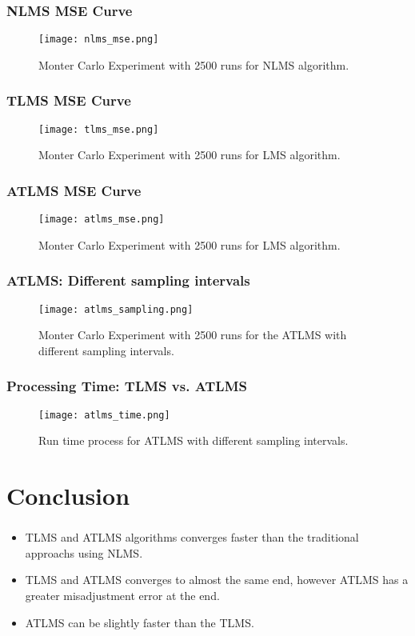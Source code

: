 \documentclass[10pt]{beamer}
\begin{document}
\begin{frame}
    \frametitle{NLMS MSE Curve}
    \begin{figure}
        \centering
        \texttt{[image: nlms\_mse.png]}
        \caption{Monter Carlo Experiment with 2500 runs for NLMS algorithm.}
        \label{fig:nlms} 
    \end{figure}
\end{frame}

\begin{frame}
    \frametitle{TLMS MSE Curve}
    \begin{figure}
        \centering
        \texttt{[image: tlms\_mse.png]}
        \caption{Monter Carlo Experiment with 2500 runs for LMS algorithm.}
        \label{fig:tlms} 
    \end{figure}
\end{frame}

\begin{frame}
    \frametitle{ATLMS MSE Curve}
    \begin{figure}
        \centering
        \texttt{[image: atlms\_mse.png]}
        \caption{Monter Carlo Experiment with 2500 runs for LMS algorithm.}
        \label{fig:atlms} 
    \end{figure}
\end{frame}

\begin{frame}
    \frametitle{ATLMS: Different sampling intervals}
    \begin{figure}
        \centering
        \texttt{[image: atlms\_sampling.png]}
        \caption{Monter Carlo Experiment with 2500 runs for the ATLMS with different sampling intervals.}
        \label{fig:atlms_sampling} 
    \end{figure}
\end{frame}

\begin{frame}
    \frametitle{Processing Time: TLMS vs. ATLMS}
    \begin{figure}
        \centering
        \texttt{[image: atlms\_time.png]}
        \caption{Run time process for ATLMS with different sampling intervals.}
        \label{fig:atlms_time} 
    \end{figure}
\end{frame}

\section{Conclusion}
\begin{frame}[allowframebreaks]
    \frametitle{\insertsection}
    \begin{itemize}
        \item TLMS and ATLMS algorithms converges faster than the traditional approachs using NLMS.
        \item TLMS and ATLMS converges to almost the same end, however ATLMS has a greater misadjustment error at the end.
        \item ATLMS can be slightly faster than the TLMS.
    \end{itemize}
\end{frame}
\end{document}
